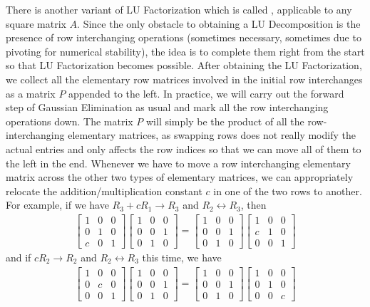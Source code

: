 There is another variant of LU Factorization which is called , applicable to any square matrix $A$. Since the only obstacle to obtaining a LU Decomposition is the presence of row interchanging operations (sometimes necessary, sometimes due to pivoting for numerical stability), the idea is to complete them right from the start so that LU Factorization becomes possible. After obtaining the LU Factorization, we collect all the elementary row matrices involved in the initial row interchanges as a matrix $P$ appended to the left. In practice, we will carry out the forward step of Gaussian Elimination as usual and mark all the row interchanging operations down. The matrix $P$ will simply be the product of all the row-interchanging elementary matrices, as swapping rows does not really modify the actual entries and only affects the row indices so that we can move all of them to the left in the end. Whenever we have to move a row interchanging elementary matrix across the other two types of elementary matrices, we can appropriately relocate the addition/multiplication constant $c$ in one of the two rows to another. For example, if we have $R_3 + cR_1 \to R_3$ and $R_2 \leftrightarrow R_3$, then
\begin{align*}
\begin{bmatrix}
1 & 0 & 0 \\
0 & 1 & 0 \\
c & 0 & 1
\end{bmatrix}
\begin{bmatrix}
1 & 0 & 0 \\
0 & 0 & 1 \\
0 & 1 & 0
\end{bmatrix}
=
\begin{bmatrix}
1 & 0 & 0 \\
0 & 0 & 1 \\
0 & 1 & 0
\end{bmatrix}
\begin{bmatrix}
1 & 0 & 0 \\
c & 1 & 0 \\
0 & 0 & 1
\end{bmatrix}
\end{align*}
and if $cR_2 \to R_2$ and $R_2 \leftrightarrow R_3$ this time, we have
\begin{align*}
\begin{bmatrix}
1 & 0 & 0 \\
0 & c & 0 \\
0 & 0 & 1
\end{bmatrix}
\begin{bmatrix}
1 & 0 & 0 \\
0 & 0 & 1 \\
0 & 1 & 0
\end{bmatrix}
=
\begin{bmatrix}
1 & 0 & 0 \\
0 & 0 & 1 \\
0 & 1 & 0
\end{bmatrix}
\begin{bmatrix}
1 & 0 & 0 \\
0 & 1 & 0 \\
0 & 0 & c
\end{bmatrix}
\end{align*}

